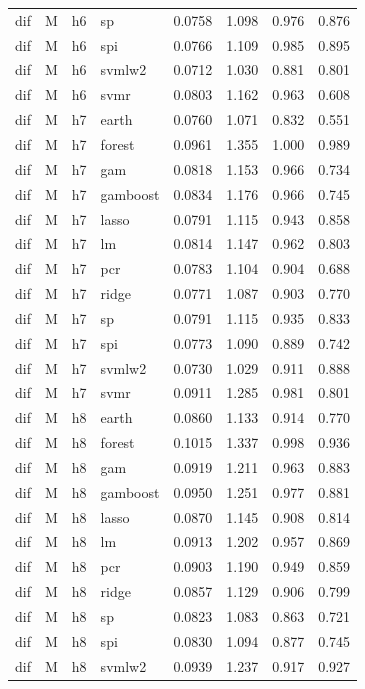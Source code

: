 \begin{ThreePartTable}
\begin{longtable}[t]{llclcccc}
dif & M & h6 & sp & 0.0758 & 1.098 & 0.976 & 0.876\\
dif & M & h6 & spi & 0.0766 & 1.109 & 0.985 & 0.895\\
dif & M & h6 & svmlw2 & 0.0712 & 1.030 & 0.881 & 0.801\\
dif & M & h6 & svmr & 0.0803 & 1.162 & 0.963 & 0.608\\
\addlinespace
dif & M & h7 & earth & 0.0760 & 1.071 & 0.832 & 0.551\\
dif & M & h7 & forest & 0.0961 & 1.355 & 1.000 & 0.989\\
dif & M & h7 & gam & 0.0818 & 1.153 & 0.966 & 0.734\\
dif & M & h7 & gamboost & 0.0834 & 1.176 & 0.966 & 0.745\\
dif & M & h7 & lasso & 0.0791 & 1.115 & 0.943 & 0.858\\
dif & M & h7 & lm & 0.0814 & 1.147 & 0.962 & 0.803\\
dif & M & h7 & pcr & 0.0783 & 1.104 & 0.904 & 0.688\\
dif & M & h7 & ridge & 0.0771 & 1.087 & 0.903 & 0.770\\
dif & M & h7 & sp & 0.0791 & 1.115 & 0.935 & 0.833\\
dif & M & h7 & spi & 0.0773 & 1.090 & 0.889 & 0.742\\
dif & M & h7 & svmlw2 & 0.0730 & 1.029 & 0.911 & 0.888\\
dif & M & h7 & svmr & 0.0911 & 1.285 & 0.981 & 0.801\\
\addlinespace
dif & M & h8 & earth & 0.0860 & 1.133 & 0.914 & 0.770\\
dif & M & h8 & forest & 0.1015 & 1.337 & 0.998 & 0.936\\
dif & M & h8 & gam & 0.0919 & 1.211 & 0.963 & 0.883\\
dif & M & h8 & gamboost & 0.0950 & 1.251 & 0.977 & 0.881\\
dif & M & h8 & lasso & 0.0870 & 1.145 & 0.908 & 0.814\\
dif & M & h8 & lm & 0.0913 & 1.202 & 0.957 & 0.869\\
dif & M & h8 & pcr & 0.0903 & 1.190 & 0.949 & 0.859\\
dif & M & h8 & ridge & 0.0857 & 1.129 & 0.906 & 0.799\\
dif & M & h8 & sp & 0.0823 & 1.083 & 0.863 & 0.721\\
dif & M & h8 & spi & 0.0830 & 1.094 & 0.877 & 0.745\\
dif & M & h8 & svmlw2 & 0.0939 & 1.237 & 0.917 & 0.927\\

\end{longtable}
\end{ThreePartTable}
